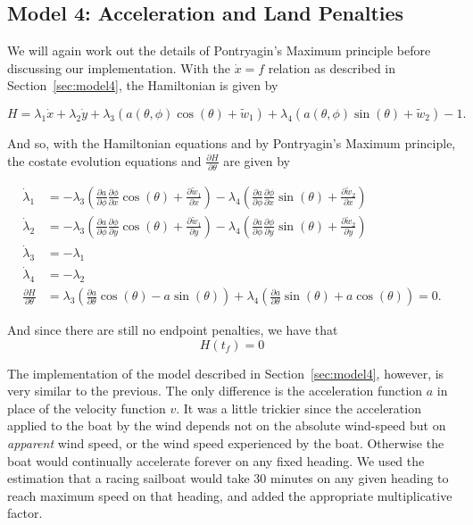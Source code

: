 \documentclass[11pt]{amsart}
\begin{document}
\subsection{Model 4: Acceleration and Land Penalties}
\par We will again work out the details of Pontryagin's Maximum principle before discussing our implementation. With the $\dot{x} = f$ relation as described in Section~\ref{sec:model4}, the Hamiltonian is given by 

$$ H = \lambda_1 \dot{x} + \lambda_2 \dot{y} + \lambda_3(a(\theta, \phi)\cos(\theta) + \tilde{w}_1) + \lambda_4(a(\theta, \phi)\sin(\theta) + \tilde{w}_2) - 1. $$

\par And so, with the Hamiltonian equations and by Pontryagin's Maximum principle, the costate evolution equations and $\frac{\partial H}{\partial \theta}$ are given by 

\begin{align*}
    \dot{\lambda}_1 &= -\lambda_3\left(\frac{\partial a}{\partial \phi} \frac{\partial \phi}{\partial x}\cos(\theta) + \frac{\partial \tilde{w}_1}{\partial x}\right) - \lambda_4\left(\frac{\partial a}{\partial \phi}\frac{\partial \phi}{\partial x} \sin(\theta) + \frac{\partial \tilde{w}_2}{\partial x}\right) \\
    \dot{\lambda}_2 &= -\lambda_3\left(\frac{\partial a}{\partial \phi} \frac{\partial \phi}{\partial y}\cos(\theta) + \frac{\partial \tilde{w}_1}{\partial y}\right) - \lambda_4\left(\frac{\partial a}{\partial \phi}\frac{\partial \phi}{\partial y} \sin(\theta) + \frac{\partial \tilde{w}_2}{\partial y}\right) \\
    \dot{\lambda}_3 &= -\lambda_1 \\
    \dot{\lambda}_4 &= -\lambda_2 \\
    \frac{\partial H}{\partial \theta} &= \lambda_3\left(\frac{\partial a}{\partial \theta} \cos(\theta) - a\sin(\theta)\right) + \lambda_4\left(\frac{\partial a}{\partial \theta} \sin(\theta) + a\cos(\theta)\right) = 0.
\end{align*}

\par And since there are still no endpoint penalties, we have that 
$$ H(t_f) = 0 $$

\par The implementation of the model described in Section~\ref{sec:model4}, however, is very similar to the previous. The only difference is the acceleration function $a$ in place of the velocity function $v$. It was a little trickier since the acceleration applied to the boat by the wind depends not on the absolute wind-speed but on \textit{apparent} wind speed, or the wind speed experienced by the boat. Otherwise the boat would continually accelerate forever on any fixed heading. We used the estimation that a racing sailboat would take 30 minutes on any given heading to reach maximum speed on that heading, and added the appropriate multiplicative factor. 
\end{document}
